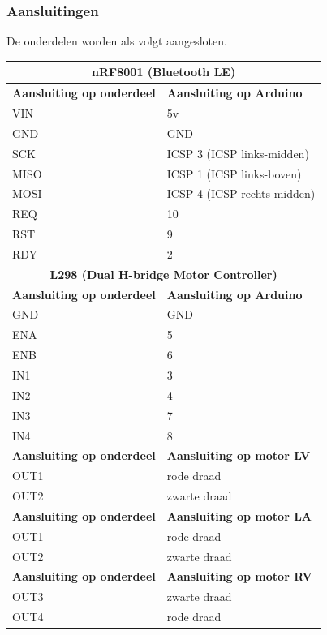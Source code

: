 \documentclass[12pt,a4paper]{article}
\begin{document}
\subsubsection{Aansluitingen}
De onderdelen worden als volgt aangesloten.			
\begin{table}[H]
	\begin{tabularx}{\textwidth}{|X|X|}	
		\hline \multicolumn{2}{|c|}{\textbf{nRF8001 (Bluetooth LE)}}	\\	 
		\hline \textbf{Aansluiting op onderdeel} & \textbf{Aansluiting op Arduino} \\
		\hline VIN & 5v \\
		\hline GND & GND \\
		\hline SCK &  ICSP 3 (ICSP links-midden)\\
		\hline MISO & ICSP 1 (ICSP links-boven)\\
		\hline MOSI & ICSP 4 (ICSP rechts-midden)\\
		\hline REQ & 10 \\
		\hline RST & 9 \\
		\hline RDY & 2 \\
		\hline \multicolumn{2}{|c|}{\textbf{L298 (Dual H-bridge Motor Controller)}}	\\	 
		\hline \textbf{Aansluiting op onderdeel} & \textbf{Aansluiting op Arduino} \\
		\hline GND & GND \\
		\hline ENA & 5  \\
		\hline ENB & 6 \\
		\hline IN1 & 3 \\
		\hline IN2 & 4 \\
		\hline IN3 & 7 \\
		\hline IN4 & 8 \\
		\hline \textbf{Aansluiting op onderdeel} & \textbf{Aansluiting op motor LV} \\
		\hline OUT1 & rode draad \\
		\hline OUT2 & zwarte draad \\
		\hline \textbf{Aansluiting op onderdeel} & \textbf{Aansluiting op motor LA} \\
		\hline OUT1 & rode draad \\
		\hline OUT2 & zwarte draad \\
		\hline \textbf{Aansluiting op onderdeel} & \textbf{Aansluiting op motor RV} \\
		\hline OUT3 & zwarte draad \\
		\hline OUT4 & rode draad \\

\end{tabularx}
\end{table}
\end{document}
